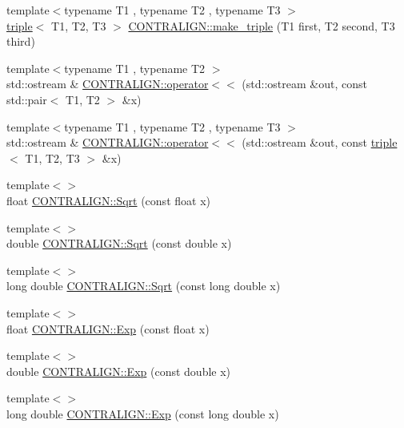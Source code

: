 \begin{DoxyCompactItemize}
\item 
{\footnotesize template$<$typename T1 , typename T2 , typename T3 $>$ }\\\hyperlink{structtriple}{triple}$<$ T1, T2, T3 $>$ \hyperlink{namespace_c_o_n_t_r_a_l_i_g_n_a98175ddcaf753882eb5f92de09f9108f}{C\+O\+N\+T\+R\+A\+L\+I\+G\+N\+::make\+\_\+triple} (T1 first, T2 second, T3 third)
\item 
{\footnotesize template$<$typename T1 , typename T2 $>$ }\\std\+::ostream \& \hyperlink{namespace_c_o_n_t_r_a_l_i_g_n_af60b1eb5579c95763c8241ab707b917e}{C\+O\+N\+T\+R\+A\+L\+I\+G\+N\+::operator$<$$<$} (std\+::ostream \&out, const std\+::pair$<$ T1, T2 $>$ \&x)
\item 
{\footnotesize template$<$typename T1 , typename T2 , typename T3 $>$ }\\std\+::ostream \& \hyperlink{namespace_c_o_n_t_r_a_l_i_g_n_a37f6d4fc947c02293236890815321e35}{C\+O\+N\+T\+R\+A\+L\+I\+G\+N\+::operator$<$$<$} (std\+::ostream \&out, const \hyperlink{structtriple}{triple}$<$ T1, T2, T3 $>$ \&x)
\item 
{\footnotesize template$<$$>$ }\\float \hyperlink{namespace_c_o_n_t_r_a_l_i_g_n_a5425dcac6298080e920d815d5181d13c}{C\+O\+N\+T\+R\+A\+L\+I\+G\+N\+::\+Sqrt} (const float x)
\item 
{\footnotesize template$<$$>$ }\\double \hyperlink{namespace_c_o_n_t_r_a_l_i_g_n_aa5b0dc66ae5b9d211a2418219cd1e7a4}{C\+O\+N\+T\+R\+A\+L\+I\+G\+N\+::\+Sqrt} (const double x)
\item 
{\footnotesize template$<$$>$ }\\long double \hyperlink{namespace_c_o_n_t_r_a_l_i_g_n_ab98bf329d8c67035829fa0055a84d591}{C\+O\+N\+T\+R\+A\+L\+I\+G\+N\+::\+Sqrt} (const long double x)
\item 
{\footnotesize template$<$$>$ }\\float \hyperlink{namespace_c_o_n_t_r_a_l_i_g_n_aeaeb9f23b84ef5a3cb1f50056b205607}{C\+O\+N\+T\+R\+A\+L\+I\+G\+N\+::\+Exp} (const float x)
\item 
{\footnotesize template$<$$>$ }\\double \hyperlink{namespace_c_o_n_t_r_a_l_i_g_n_a4f40660e51cb8debd179b0e375b8e9f0}{C\+O\+N\+T\+R\+A\+L\+I\+G\+N\+::\+Exp} (const double x)
\item 
{\footnotesize template$<$$>$ }\\long double \hyperlink{namespace_c_o_n_t_r_a_l_i_g_n_a2f9f92ee735011a2f6864ff388a15ebe}{C\+O\+N\+T\+R\+A\+L\+I\+G\+N\+::\+Exp} (const long double x)

\end{DoxyCompactItemize}
